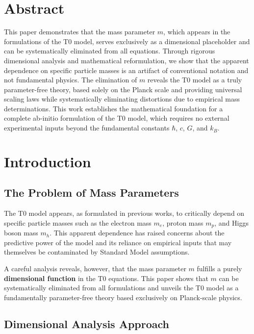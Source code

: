 \section*{Abstract}
		This paper demonstrates that the mass parameter $m$, which appears in the formulations of the T0 model, serves exclusively as a dimensional placeholder and can be systematically eliminated from all equations. Through rigorous dimensional analysis and mathematical reformulation, we show that the apparent dependence on specific particle masses is an artifact of conventional notation and not fundamental physics. The elimination of $m$ reveals the T0 model as a truly parameter-free theory, based solely on the Planck scale and providing universal scaling laws while systematically eliminating distortions due to empirical mass determinations. This work establishes the mathematical foundation for a complete ab-initio formulation of the T0 model, which requires no external experimental inputs beyond the fundamental constants $\hbar$, $c$, $G$, and $k_B$.

	

	\section{Introduction}
	\label{sec:introduction}
	
	\subsection{The Problem of Mass Parameters}
	\label{subsec:mass_problem}
	
	The T0 model appears, as formulated in previous works, to critically depend on specific particle masses such as the electron mass $m_e$, proton mass $m_p$, and Higgs boson mass $m_h$. This apparent dependence has raised concerns about the predictive power of the model and its reliance on empirical inputs that may themselves be contaminated by Standard Model assumptions.
	
	A careful analysis reveals, however, that the mass parameter $m$ fulfills a purely \textbf{dimensional function} in the T0 equations. This paper shows that $m$ can be systematically eliminated from all formulations and unveils the T0 model as a fundamentally parameter-free theory based exclusively on Planck-scale physics.
	
	\subsection{Dimensional Analysis Approach}
	\label{subsec:dimensional_approach}
	
